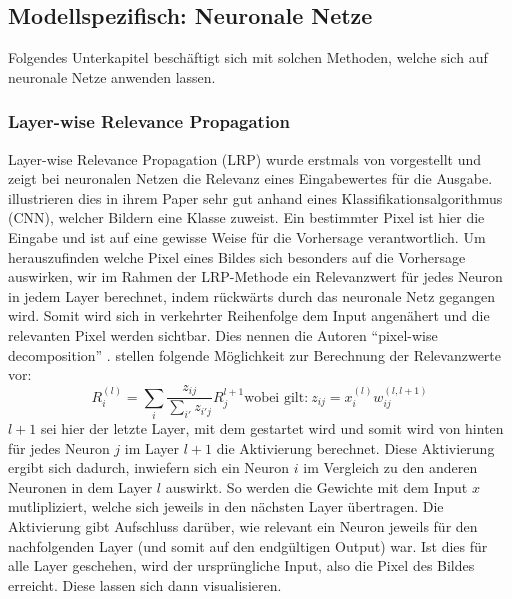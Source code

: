 \subsection{Modellspezifisch: Neuronale Netze}
Folgendes Unterkapitel beschäftigt sich mit solchen Methoden, welche sich auf neuronale Netze anwenden lassen.
\subsubsection{Layer-wise Relevance Propagation}
Layer-wise Relevance Propagation (LRP) wurde erstmals von \cite{bach2015pixel} vorgestellt und zeigt bei neuronalen Netzen die Relevanz eines Eingabewertes für die Ausgabe. \textcite{bach2015pixel} illustrieren dies in ihrem Paper sehr gut anhand eines Klassifikationsalgorithmus (CNN), welcher Bildern eine Klasse zuweist. Ein bestimmter Pixel ist hier die Eingabe und ist auf eine gewisse Weise für die Vorhersage verantwortlich. Um herauszufinden welche Pixel eines Bildes sich besonders auf die Vorhersage auswirken, wir im Rahmen der LRP-Methode ein Relevanzwert für jedes Neuron in jedem Layer berechnet, indem rückwärts durch das neuronale Netz gegangen wird. Somit wird sich in verkehrter Reihenfolge dem Input angenähert und die relevanten Pixel werden sichtbar. Dies nennen die Autoren \enquote{pixel-wise decomposition} \cite{bach2015pixel}. \textcite{bach2015pixel} stellen folgende Möglichkeit zur Berechnung der Relevanzwerte vor:
\begin{equation}
    R_{i}^{(l)} = \sum_{i} \frac{z_{ij}}{\sum_{i'}z_{i'j}}R_{j}^{l+1} \text{wobei gilt:}\: z_{ij}=x_{i}^{(l)}w_{ij}^{(l,l+1)}
\end{equation}
$l+1$ sei hier der letzte Layer, mit dem gestartet wird und somit wird von hinten für jedes Neuron $j$ im Layer $l+1$ die Aktivierung berechnet. Diese Aktivierung ergibt sich dadurch, inwiefern sich ein Neuron $i$ im Vergleich zu den anderen Neuronen in dem Layer $l$ auswirkt. So werden die Gewichte mit dem Input $x$ mutlipliziert, welche sich jeweils in den nächsten Layer übertragen. Die Aktivierung gibt Aufschluss darüber, wie relevant ein Neuron jeweils für den nachfolgenden Layer (und somit auf den endgültigen Output) war. Ist dies für alle Layer geschehen, wird der ursprüngliche Input, also die Pixel des Bildes erreicht. Diese lassen sich dann visualisieren.

